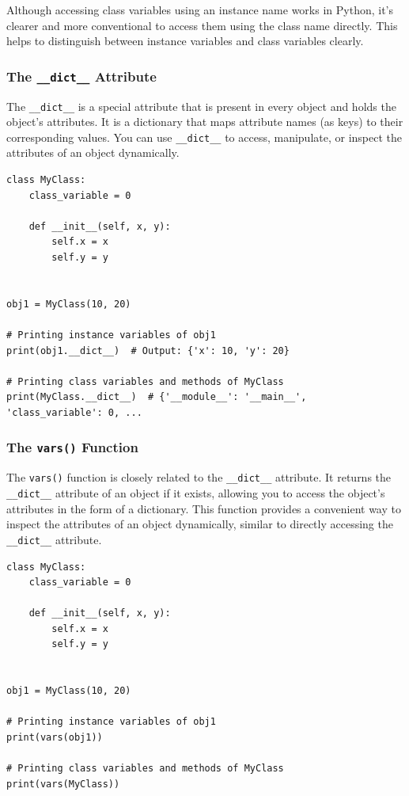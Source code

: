 Although accessing class variables using an instance name works in Python, it's clearer and more conventional to access them using the class name directly. This helps to distinguish between instance variables and class variables clearly.

\newpage
\subsubsection{The \texttt{\_\_dict\_\_} Attribute}
The \texttt{\_\_dict\_\_} is a special attribute that is present in every object and holds the object's attributes. It is a dictionary that maps attribute names (as keys) to their corresponding values. You can use \texttt{\_\_dict\_\_} to access, manipulate, or inspect the attributes of an object dynamically.

\begin{codebox}
\begin{verbatim}
class MyClass:
    class_variable = 0

    def __init__(self, x, y):
        self.x = x  
        self.y = y  


obj1 = MyClass(10, 20)

# Printing instance variables of obj1
print(obj1.__dict__)  # Output: {'x': 10, 'y': 20}

# Printing class variables and methods of MyClass
print(MyClass.__dict__)  # {'__module__': '__main__', 'class_variable': 0, ...
\end{verbatim}
\end{codebox}

\subsubsection{The \texttt{vars()} Function}

The \texttt{vars()} function is closely related to the \texttt{\_\_dict\_\_} attribute. It returns the \texttt{\_\_dict\_\_} attribute of an object if it exists, allowing you to access the object's attributes in the form of a dictionary. This function provides a convenient way to inspect the attributes of an object dynamically, similar to directly accessing the \texttt{\_\_dict\_\_} attribute.

\begin{codebox}
\begin{verbatim}
class MyClass:
    class_variable = 0

    def __init__(self, x, y):
        self.x = x  
        self.y = y  


obj1 = MyClass(10, 20)

# Printing instance variables of obj1
print(vars(obj1))

# Printing class variables and methods of MyClass
print(vars(MyClass))
\end{verbatim}
\end{codebox}

